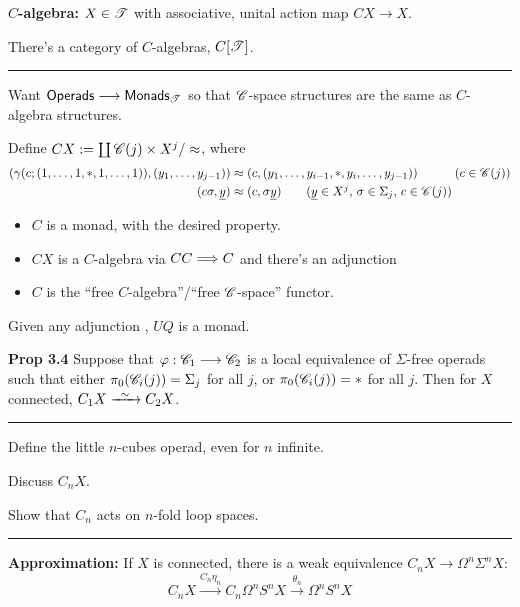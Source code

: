 \documentclass[11pt]{article}
\begin{document}
\begin{Operads}
\begin{itemise}
\[{}
\]
\item \textbf{$C$-algebra:} $X\in\mathscr{T}$ with associative, unital action map $CX\to X$.
\item There's a category of $C$-algebras, $C[\mathscr{T}]$.
\hrule
\item Want $\mathsf{Operads}\longrightarrow\mathsf{Monads_{\mathscr{T}}}$ so that $\mathscr{C}$-space structures are the same as $C$-algebra structures.
\item Define $CX:=\coprod\mathscr{C}(j)\times X^j/\approx$, where
\begin{alignat*}{2}
(\gamma(c;(1,\ldots,1,*,1,\ldots,1)),(y_1,\ldots,y_{j-1}))&\approx(c,(y_1,\ldots,y_{i-1},*,y_i,\ldots,y_{j-1}))&\qquad& \text{($c\in\scrC(j)$)}
\\(c\sigma,\underline{y})&\approx (c,\sigma\underline{y})\makebox[0cm][l]{\qquad ($\underline{y}\in X^j$, $\sigma\in\Sigma_j$, $c\in\scrC(j)$)}%
\end{alignat*}
\begin{itemize}\squishlist
\item $C$ is a monad, with the desired property.
\item $CX$ is a $C$-algebra via $CC\Longrightarrow C$ and there's an adjunction 
\item $C$ is the ``free $C$-algebra''/``free $\mathscr{C}$-space'' functor.
\end{itemize}
\item Given any adjunction , $UQ$ is a monad.
\item \textbf{Prop 3.4} Suppose that $\varphi:\mathscr{C}_1\longrightarrow\mathscr{C}_2$ is a local equivalence of $\Sigma$-free operads such that either $\pi_0(\mathscr{C}_i(j))=\Sigma_j$ for all $j$, or $\pi_0(\mathscr{C}_i(j))=*$ for all $j$. Then for $X$ connected, $C_1X\weakequiv C_2X$.
\hrule
\item Define the little $n$-cubes operad, even for $n$ infinite.
\item Discuss $C_nX$.
\item Show that $C_n$ acts on $n$-fold loop spaces.
\hrule
\item \textbf{Approximation:} If $X$ is connected, there is a weak equivalence $C_nX\to\Omega^n\Sigma^nX$:
\[C_nX\overset{C_n\eta_n}{\to}C_n\Omega^nS^nX\overset{\theta_n}{\to}\Omega^nS^nX\]

\end{itemise}
\end{Operads}
\end{document}
